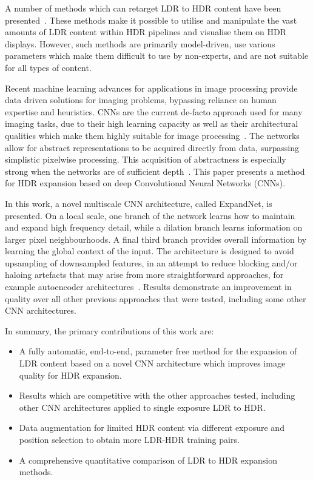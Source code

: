 \documentclass{egpubl}
\begin{document}
A number of methods which can retarget LDR to HDR content have been
presented~\cite{banterle2011hdrbook}. These methods make it possible to utilise
and manipulate the vast amounts of LDR content within HDR pipelines and
visualise them on HDR displays. However, such methods are primarily
model-driven, use various parameters which make them difficult to use by
non-experts, and are not suitable for all types of content.

Recent machine learning advances for applications in image processing provide
data driven solutions for imaging problems, bypassing reliance on human
expertise and heuristics. CNNs are the current de-facto approach used for many
imaging tasks, due to their high learning capacity as well as their
architectural qualities which make them highly suitable for image
processing~\cite{schmidhuber2014deep}. The networks allow for abstract
representations to be acquired directly from data, surpassing simplistic
pixelwise processing. This acquisition of abstractness is especially strong
when the networks are of sufficient depth~\cite{he2015residual}. This paper
presents a method for HDR expansion based on deep Convolutional Neural Networks
(CNNs).

In this work, a novel multiscale CNN architecture, called ExpandNet, is
presented. On a local scale, one branch of the network learns how to maintain
and expand high frequency detail, while a dilation branch learns information
on larger pixel neighbourhoods. A final third branch provides overall
information by learning the global context of the input. The architecture is
designed to avoid upsampling of downsampled features, in an attempt to reduce
blocking and/or haloing artefacts that may arise from more straightforward
approaches, for example autoencoder architectures~\cite{bengio2009deep}.
Results demonstrate an improvement in quality over all other previous
approaches that were tested, including some other CNN architectures.

\noindent In summary, the primary contributions of this work are:
\begin{itemize}
  \item A fully automatic, end-to-end, parameter free method for the expansion
      of LDR content based on a novel CNN architecture which improves image
      quality for HDR expansion.
  \item Results which are competitive with the other approaches tested, including other CNN architectures applied to single exposure LDR to HDR.
  \item Data augmentation for limited HDR content via different exposure and position selection to obtain more LDR-HDR training pairs.
  \item A comprehensive quantitative comparison of LDR to HDR expansion methods.
\end{itemize}
 
\end{document}
